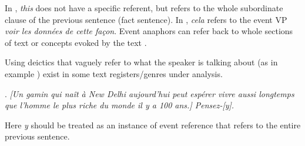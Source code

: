 \documentclass[a4paper]{article}
\begin{document}
In \Last[a], {\sl this} does not have a specific referent, but refers to the
whole subordinate clause of the previous sentence (fact sentence). In \Last[b],
\textsl{cela} refers to the event VP \textsl{voir les données de cette façon}.
Event anaphors can refer back to whole sections of text or concepts evoked by
the text \cite[p. 8]{GuillouEtAlGuide}. 


% 

Using deictics that vaguely refer to what the speaker is talking about (as in example \Next) exist in some text registers/genres under analysis. 

\ex.
\textsl{[Un gamin qui naît à New Delhi aujourd'hui peut espérer vivre aussi
longtemps que l'homme le plus riche du monde il y a 100 ans.] Pensez-[y].}

Here \textsl{y} should be treated as an instance of event reference that refers
to the entire previous sentence.
\end{document}
